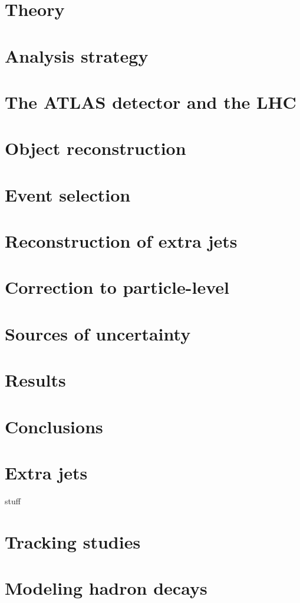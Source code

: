 \documentclass[12pt]{ucbthesis}
\begin{document}
\chapter{Theory}
\label{ch:theory}

\chapter{Analysis strategy}
\label{ch:strategy}

\chapter{The ATLAS detector and the LHC}
\label{ch:atlas}

\chapter{Object reconstruction}
\label{ch:objects}

\chapter{Event selection}
\label{ch:event}

\chapter{Reconstruction of extra jets}
\label{ch:extrajets}

\chapter{Correction to particle-level}
\label{ch:unfolding}

\chapter{Sources of uncertainty}
\label{ch:uncert}

\chapter{Results}
\label{ch:results}

\chapter{Conclusions}
\label{ch:conclusions}

\appendix
\chapter{Extra jets}
stuff
\chapter{Tracking studies}

\chapter{Modeling hadron decays}


\backmatter


\end{document}
